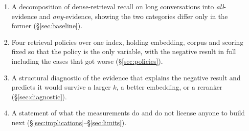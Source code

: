 \begin{enumerate}[leftmargin=*]
\item A decomposition of dense-retrieval recall on long conversations into
  \emph{all}-evidence and \emph{any}-evidence, showing the two categories differ
  only in the former (\S\ref{sec:baseline}).
\item Four retrieval policies over one index, holding embedding, corpus and
  scoring fixed so that the policy is the only variable, with the negative result
  in full including the cases that got worse (\S\ref{sec:policies}).
\item A structural diagnostic of the evidence that explains the negative result
  and predicts it would survive a larger $k$, a better embedding, or a reranker
  (\S\ref{sec:diagnostic}).
\item A statement of what the measurements do and do not license anyone to build
  next (\S\ref{sec:implications}--\S\ref{sec:limits}).
\end{enumerate}
